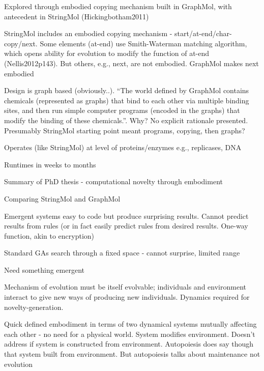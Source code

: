 			
			Explored through embodied copying mechanism built in GraphMol, with
			antecedent in StringMol (Hickingbotham2011)
			

			StringMol includes an embodied copying mechanism -
			start/at-end/char-copy/next. Some elements (at-end) use Smith-Waterman
			matching algorithm, which opens ability for evolution to modify the
			function of at-end (Nellis2012p143). But others, e.g., next, are not
			embodied. GraphMol makes next embodied
			

			Design is graph based (obviously..). ``The world defined by GraphMol
			contains chemicals (represented as graphs) that bind to each other via
			multiple binding sites, and then run simple computer programs (encoded
			in the graphs) that modify the binding of these chemicals.''. Why? No
			explicit rationale presented. Presumably StringMol starting point
			meant programs, copying, then graphs?
			
	
			Operates (like StringMol) at level of proteins/enzymes e.g.,
			replicases, DNA
			
			
			Runtimes in weeks to months
			
		
\autocite{Nellis2014}

			Summary of PhD thesis - computational novelty through embodiment
			

			Comparing StringMol and GraphMol


			Emergent systems easy to code but produce surprising results. Cannot
			predict results from rules (or in fact easily predict rules from
			desired results. One-way function, akin to encryption)
			

			
			Standard GAs search through a fixed space - cannot surprise, limited
			range
			

			
			Need something emergent

			
			Mechanism of evolution must be itself evolvable; individuals and
			environment interact to give new ways of producing new individuals.
			Dynamics required for novelty-generation.

			Quick defined embodiment in terms of two dynamical systems mutually
			affecting each other - no need for a physical world. System modifies
			environment. Doesn't address if system is constructed from
			environment. Autopoiesis does say though that system built from
			environment. But autopoiesis talks about maintenance not evolution
			

